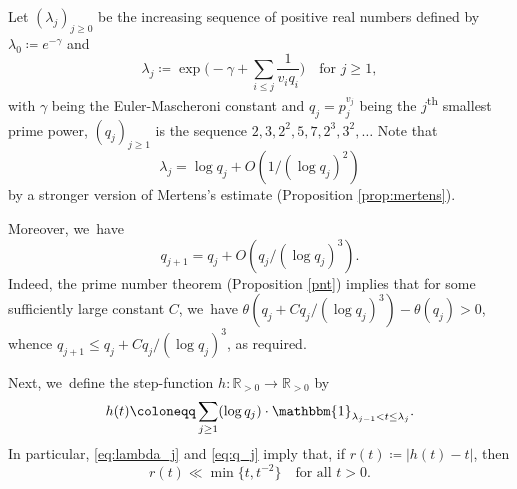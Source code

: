 \documentclass[10pt]{amsart}
\newcommand{\RR}{\mathbb{R}}
\newcommand{\one}{\mathbbm{1}}
\newcommand{\bgg}{\Big}
\theoremstyle{plain}
\theoremstyle{definition}
\begin{document}
Let $(\lambda_j)_{j \ge 0}$ be the increasing sequence of positive real numbers defined by $\lambda_0 \coloneqq e^{-\gamma}$ and
\[
\lambda_j \coloneqq \exp\!\bgg(\!-\gamma+ \sum_{i \le j} \frac{1}{v_iq_i}\bgg)\quad \text{for $j \ge 1$},
\]
with $\gamma$ being the Euler-Mascheroni constant and $q_j = p_j^{v_j}$ being the $j$\textsuperscript{th} smallest prime power, \ie $(q_j)_{j \ge 1}$ is the sequence $2, 3, 2^2, 5, 7, 2^3, 3^2,\dots$ Note that
\begin{equation}
\label{eq:lambda_j}
\lambda_j = \log q_j +O(1/(\log q_j)^2)
\end{equation}
by a stronger version of Mertens's estimate (Proposition \ref{prop:mertens}).

Moreover, we~have
\begin{equation}
\label{eq:q_j}
q_{j+1} = q_j+O(q_j/(\log q_j)^3).
\end{equation}
Indeed, the prime number theorem (Proposition \ref{pnt}) implies that for some sufficiently large constant $C$, we~have $\theta(q_j+Cq_j/(\log q_j)^3) -\theta(q_j)>0$, whence $q_{j+1}\le q_j+Cq_j/(\log q_j)^3$, as required.

Next, we~define the step-function $h:\RR_{>0} \to \RR_{>0}$ by
\begin{equation}
\label{eq:h(t) dfn}
h(t) \coloneqq \sum_{j \ge 1} (\log q_j) \cdot \one_{\lambda_{j-1} < t \le \lambda_j}.
\end{equation}
In particular, \eqref{eq:lambda_j} and \eqref{eq:q_j} imply that, if $r(t) \coloneqq |h(t) - t|$, then
\begin{equation}
\label{eq:h(t) estimate}
r(t) \ll \min\{t, t^{-2}\} \quad \text{for all $t > 0$.}
\end{equation}
\end{document}
